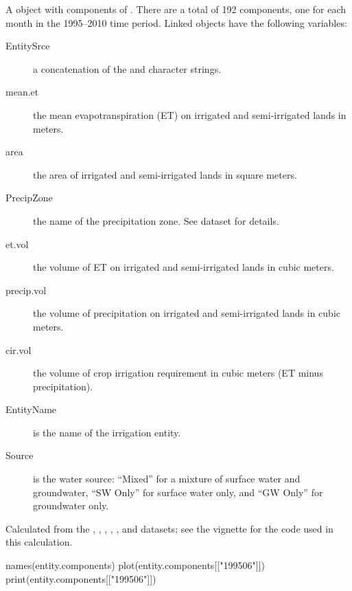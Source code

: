 \documentclass[a4paper]{book}
\begin{document}
\begin{Format}
A  object with components of .
There are a total of 192 components, one for each month in the 1995--2010 time period.
Linked  objects have the following variables:
\begin{description}

\item[EntitySrce] a concatenation of the  and  character strings.
\item[mean.et] the mean evapotranspiration (ET) on irrigated and semi-irrigated lands in meters.
\item[area] the area of irrigated and semi-irrigated lands in square meters.
\item[PrecipZone] the name of the precipitation zone.
See  dataset for details.
\item[et.vol] the volume of ET on irrigated and semi-irrigated lands in cubic meters.
\item[precip.vol] the volume of precipitation on irrigated and semi-irrigated lands in cubic meters.
\item[cir.vol] the volume of crop irrigation requirement in cubic meters (ET minus precipitation).
\item[EntityName] is the name of the irrigation entity.
\item[Source] is the water source: ``Mixed'' for a mixture of surface water and groundwater, ``SW Only'' for surface water only, and ``GW Only'' for groundwater only.

\end{description}

\end{Format}
%
\begin{Source}\relax
Calculated from the , , , , , and  datasets;
see the  vignette for the \R{} code used in this calculation.
\end{Source}
%
\begin{Examples}
\begin{ExampleCode}
names(entity.components)
plot(entity.components[["199506"]])
print(entity.components[["199506"]])
\end{ExampleCode}
\end{Examples}
\end{document}
